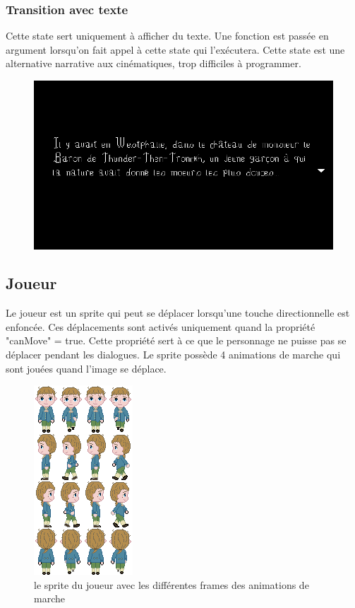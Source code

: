 \documentclass[11pt]{article}
\begin{document}
\begin{appendices}
\subsubsection{Transition avec texte}
Cette state sert uniquement à afficher du texte. Une fonction est passée en argument lorsqu'on fait appel à cette state qui l'exécutera. Cette state est une alternative narrative aux cinématiques, trop difficiles à programmer.
\begin{figure}[H]
\includegraphics[scale=0.33]{introScreen}
\centering
\end{figure}  
\subsection{Joueur}
Le joueur est un sprite qui peut se déplacer lorsqu'une touche directionnelle est enfoncée. Ces déplacements sont activés uniquement quand la propriété "canMove" = true. Cette propriété sert à ce que le personnage ne puisse pas se déplacer pendant les dialogues. Le sprite possède 4 animations de marche qui sont jouées quand l'image se déplace.\\
\begin{figure}[h]
\includegraphics[scale=0.5]{candideSprite}
\centering
\caption{le sprite du joueur avec les différentes frames des animations de marche}
\end{figure}



\end{appendices}
\end{document}
